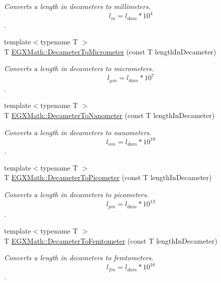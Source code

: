 \begin{DoxyCompactItemize}
\begin{DoxyCompactList}\small\item\em Converts a length in decameters to millimeters. \[ l_{m}=l_{dam} * 10^{4} \]. \end{DoxyCompactList}\item 
{\footnotesize template$<$typename T $>$ }\\T \mbox{\hyperlink{group___e_g_x_math-_conversions-_length_conversions-_decameter-_s_i_gaa5b6d3a32a921345aa1ccb66a8df07c1}{E\+G\+X\+Math\+::\+Decameter\+To\+Micrometer}} (const T length\+In\+Decameter)
\begin{DoxyCompactList}\small\item\em Converts a length in decameters to micrometers. \[ l_{\mu m}=l_{dam} * 10^{7} \]. \end{DoxyCompactList}\item 
{\footnotesize template$<$typename T $>$ }\\T \mbox{\hyperlink{group___e_g_x_math-_conversions-_length_conversions-_decameter-_s_i_gad2173f361037d8cfbdcc6b99c79a9105}{E\+G\+X\+Math\+::\+Decameter\+To\+Nanometer}} (const T length\+In\+Decameter)
\begin{DoxyCompactList}\small\item\em Converts a length in decameters to nanometers. \[ l_{nm}=l_{dam} * 10^{10} \]. \end{DoxyCompactList}\item 
{\footnotesize template$<$typename T $>$ }\\T \mbox{\hyperlink{group___e_g_x_math-_conversions-_length_conversions-_decameter-_s_i_gab265bbced03f7b08cf4ad0db29da6dfd}{E\+G\+X\+Math\+::\+Decameter\+To\+Picometer}} (const T length\+In\+Decameter)
\begin{DoxyCompactList}\small\item\em Converts a length in decameters to picometers. \[ l_{pm}=l_{dam} * 10^{13} \]. \end{DoxyCompactList}\item 
{\footnotesize template$<$typename T $>$ }\\T \mbox{\hyperlink{group___e_g_x_math-_conversions-_length_conversions-_decameter-_s_i_gae42b64853340c10623d206afbc6a9ff4}{E\+G\+X\+Math\+::\+Decameter\+To\+Femtometer}} (const T length\+In\+Decameter)
\begin{DoxyCompactList}\small\item\em Converts a length in decameters to femtometers. \[ l_{fm}=l_{dam} * 10^{16} \]. \end{DoxyCompactList}\item 

\end{DoxyCompactItemize}
